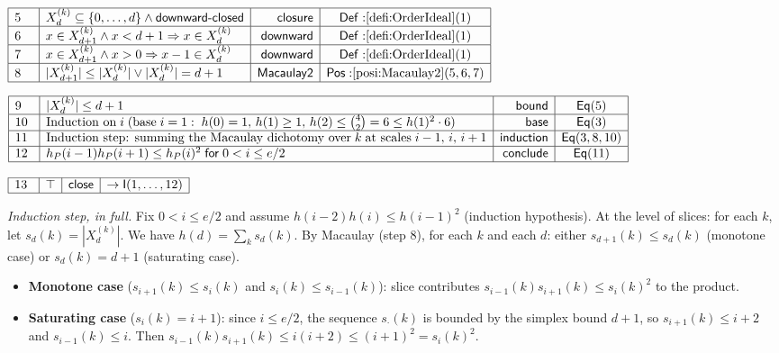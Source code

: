 \documentclass[11pt,reqno]{amsart}
\begin{document}
\nointerlineskip\noindent$%
\begin{array}{|m{0.5cm}|l|r|c|}
\hline
5 & X_{d}^{(k)}\subseteq\{0,\dots,d\}\wedge\mathsf{downward\text{-}closed} & 
\mathsf{closure} & \mathsf{Def:}\ref{defi:OrderIdeal}(1) \\ \hline
6 & x\in X_{d+1}^{(k)}\wedge x<d+1\Rightarrow x\in X_{d}^{(k)} & \mathsf{%
downward} & \mathsf{Def:}\ref{defi:OrderIdeal}(1) \\ \hline
7 & x\in X_{d+1}^{(k)}\wedge x>0\Rightarrow x-1\in X_{d}^{(k)} & \mathsf{%
downward} & \mathsf{Def:}\ref{defi:OrderIdeal}(1) \\ \hline
8 & |X_{d+1}^{(k)}|\le|X_{d}^{(k)}|\vee|X_{d}^{(k)}|=d+1 & \mathsf{Macaulay2}
& \mathsf{Pos:}\ref{posi:Macaulay2}(5,6,7) \\ \hline
\end{array}%
$

\nointerlineskip\noindent$%
\begin{array}{|m{0.5cm}|l|r|c|}
\hline
9 & |X_{d}^{(k)}|\le d+1 & \mathsf{bound} & \mathsf{Eq}(5) \\ \hline
10 & \text{Induction on}\;i\;(\text{base}\;i=1:\;h(0)=1,\,h(1)\ge 1,\,h(2)\le%
\binom{4}{2}=6\le h(1)^{2}\cdot 6) & \mathsf{base} & \mathsf{Eq}(3) \\ \hline
11 & \text{Induction step: summing the Macaulay dichotomy over}\;k\;\text{at
scales}\;i-1,\,i,\,i+1 & \mathsf{induction} & \mathsf{Eq}(3,8,10) \\ \hline
12 & h_{P}(i-1)h_{P}(i+1)\le h_{P}(i)^{2}\;\mathsf{for}\;0<i\le e/2 & 
\mathsf{conclude} & \mathsf{Eq}(11) \\ \hline
\end{array}%
$

\nointerlineskip\noindent$%
\begin{array}{|m{0.5cm}|l|r|c|}
\hline
13 & \top & \mathsf{close} & \to\mathsf{I}(1,\dots,12) \\ \hline
\end{array}%
$

\medskip \noindent\textit{Induction step, in full.} Fix $0<i\le e/2$ and
assume $h(i-2)h(i)\le h(i-1)^{2}$ (induction hypothesis). At the level of
slices: for each $k$, let $s_{d}(k)=|X_{d}^{(k)}|$. We have $%
h(d)=\sum_{k}s_{d}(k)$. By Macaulay (step 8), for each $k$ and each $d$:
either $s_{d+1}(k)\le s_{d}(k)$ (monotone case) or $s_{d}(k)=d+1$
(saturating case).

\begin{itemize}
\item \textbf{Monotone case} ($s_{i+1}(k)\le s_{i}(k)$ and $s_{i}(k)\le
s_{i-1}(k)$): slice contributes $s_{i-1}(k)s_{i+1}(k)\le s_{i}(k)^{2}$ to
the product.

\item \textbf{Saturating case} ($s_{i}(k)=i+1$): since $i\le e/2$, the
sequence $s_{\cdot}(k)$ is bounded by the simplex bound $d+1$, so $%
s_{i+1}(k)\le i+2$ and $s_{i-1}(k)\le i$. Then $s_{i-1}(k)s_{i+1}(k)\le
i(i+2)\le(i+1)^{2}=s_{i}(k)^{2}$.
\end{itemize}
\end{document}
